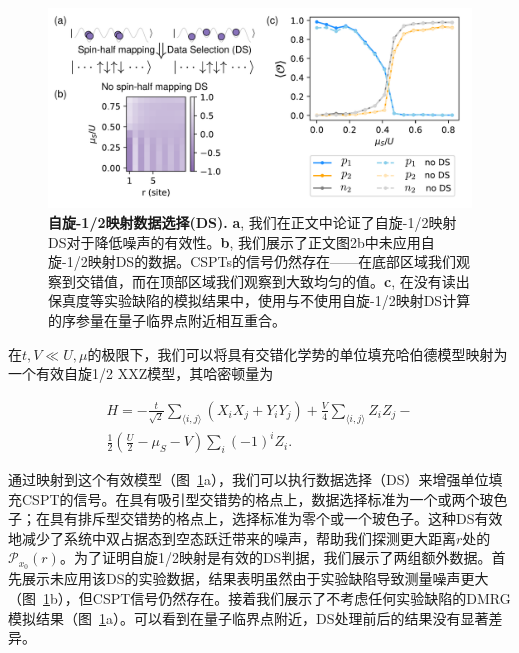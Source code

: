 \documentclass[preprint,superscriptaddress,floatfix, nofootinbib]{revtex4-2}
\begin{document}
\begin{figure}
    \centering
    \includegraphics[width=\textwidth]{figures/DS.pdf}
    \caption{\textbf{自旋-1/2映射数据选择(DS).} \textbf{a}, 我们在正文中论证了自旋-1/2映射DS对于降低噪声的有效性。\textbf{b}, 我们展示了正文图2b中未应用自旋-1/2映射DS的数据。CSPTs的信号仍然存在——在底部区域我们观察到交错值，而在顶部区域我们观察到大致均匀的值。\textbf{c}, 在没有读出保真度等实验缺陷的模拟结果中，使用与不使用自旋-1/2映射DS计算的序参量在量子临界点附近相互重合。
    }
    \label{fig: spin_half_DS_extended_data}
\end{figure}

在$t, V\ll U, \mu$的极限下，我们可以将具有交错化学势的单位填充哈伯德模型映射为一个有效自旋1/2 XXZ模型，其哈密顿量为

\begin{equation}
\label{eq: XXZ_Hamiltonian}
\begin{split}
H=-\frac{t}{\sqrt{2}}\sum_{\langle i,j \rangle}(X_iX_j+Y_iY_j)+\frac{V}{4}\sum_{\langle i,j \rangle}Z_iZ_j-\\\frac{1}{2}(\frac{U}{2}-\mu_S-V)\sum_i(-1)^iZ_i.
\end{split}
\end{equation}

通过映射到这个有效模型（图~\ref{fig: spin_half_DS_extended_data}a），我们可以执行数据选择（DS）来增强单位填充CSPT的信号。在具有吸引型交错势的格点上，数据选择标准为一个或两个玻色子；在具有排斥型交错势的格点上，选择标准为零个或一个玻色子。这种DS有效地减少了系统中双占据态到空态跃迁带来的噪声，帮助我们探测更大距离$r$处的$\mathcal{P}_{x_0}(r)$。为了证明自旋1/2映射是有效的DS判据，我们展示了两组额外数据。首先展示未应用该DS的实验数据，结果表明虽然由于实验缺陷导致测量噪声更大（图~\ref{fig: spin_half_DS_extended_data}b），但CSPT信号仍然存在。接着我们展示了不考虑任何实验缺陷的DMRG模拟结果（图~\ref{fig: spin_half_DS_extended_data}a）。可以看到在量子临界点附近，DS处理前后的结果没有显著差异。
\end{document}

